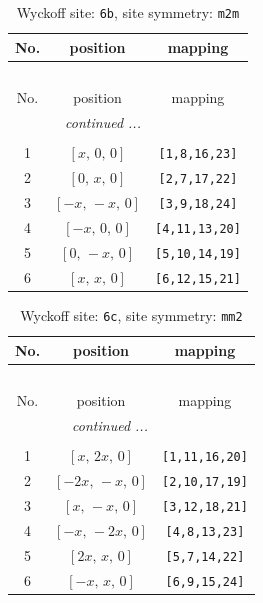 \documentclass[fleqn,8pt]{jsarticle}
\begin{document}
\begin{longtable}{ccc}
\caption{Wyckoff site: {\tt 6b}, site symmetry: {\tt m2m}}
 \\
 \hline \hline
No. & position & mapping \\ \hline \endfirsthead

\multicolumn{2}{l}{\tablename\ \thetable{}} \\
 \hline \hline
No. & position & mapping \\ \hline \endhead

 \hline \hline
\multicolumn{2}{r}{\footnotesize\it continued ...} \\ \endfoot

 \hline \hline
\multicolumn{2}{r}{} \\ \endlastfoot

1 & $\left[ x,\, 0,\, 0 \right]$ & {\tt [1,8,16,23]} \\ \hline
2 & $\left[ 0,\, x,\, 0 \right]$ & {\tt [2,7,17,22]} \\ \hline
3 & $\left[ - x,\, - x,\, 0 \right]$ & {\tt [3,9,18,24]} \\ \hline
4 & $\left[ - x,\, 0,\, 0 \right]$ & {\tt [4,11,13,20]} \\ \hline
5 & $\left[ 0,\, - x,\, 0 \right]$ & {\tt [5,10,14,19]} \\ \hline
6 & $\left[ x,\, x,\, 0 \right]$ & {\tt [6,12,15,21]} \\
\end{longtable}
\renewcommand{\arraystretch}{1.2}
\begin{longtable}{ccc}
\caption{Wyckoff site: {\tt 6c}, site symmetry: {\tt mm2}}
 \\
 \hline \hline
No. & position & mapping \\ \hline \endfirsthead

\multicolumn{2}{l}{\tablename\ \thetable{}} \\
 \hline \hline
No. & position & mapping \\ \hline \endhead

 \hline \hline
\multicolumn{2}{r}{\footnotesize\it continued ...} \\ \endfoot

 \hline \hline
\multicolumn{2}{r}{} \\ \endlastfoot

1 & $\left[ x,\, 2 x,\, 0 \right]$ & {\tt [1,11,16,20]} \\ \hline
2 & $\left[ - 2 x,\, - x,\, 0 \right]$ & {\tt [2,10,17,19]} \\ \hline
3 & $\left[ x,\, - x,\, 0 \right]$ & {\tt [3,12,18,21]} \\ \hline
4 & $\left[ - x,\, - 2 x,\, 0 \right]$ & {\tt [4,8,13,23]} \\ \hline
5 & $\left[ 2 x,\, x,\, 0 \right]$ & {\tt [5,7,14,22]} \\ \hline
6 & $\left[ - x,\, x,\, 0 \right]$ & {\tt [6,9,15,24]} \\
\end{longtable}
\end{document}
